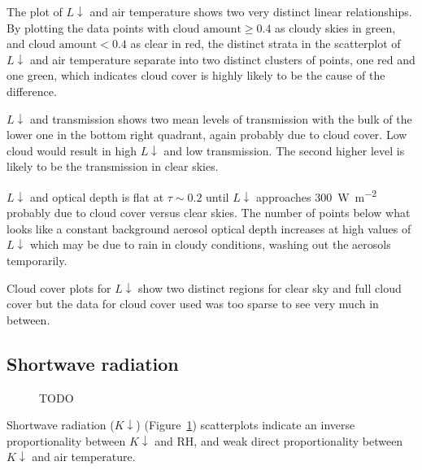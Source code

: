 \documentclass[a4paper,titlepage, twoside]{report}
\newcommand\Kdown{K\!\!\downarrow}
\newcommand\Ldown{L\!\!\downarrow}
\begin{document}
The plot of $\Ldown$ and air temperature shows two very distinct linear relationships. By plotting the data points with $\text{cloud amount} \geq 0.4$ as cloudy skies in green, and $\text{cloud amount} < 0.4$ as clear in red, the distinct strata in the scatterplot of $\Ldown$ and air temperature separate into two distinct clusters of points, one red and one green, which indicates cloud cover is highly likely to be the cause of the difference.

$\Ldown$ and transmission shows two mean levels of transmission with the bulk of the lower one in the bottom right quadrant, again probably due to cloud cover. Low cloud would result in high $\Ldown$ and low transmission. The second higher level is likely to be the transmission in clear skies.

$\Ldown$ and optical depth is flat at $\tau \sim 0.2$ until $\Ldown$ approaches \SI{300}{\watt\per\meter\squared} probably due to cloud cover versus clear skies. The number of points below what looks like a constant background aerosol optical depth increases at high values of $\Ldown$ which may be due to rain in cloudy conditions, washing out the aerosols temporarily.

Cloud cover plots for $\Ldown$ show two distinct regions for clear sky and full cloud cover but the data for cloud cover used was too sparse to see very much in between.

\subsection{Shortwave radiation}
\begin{figure}
\centering
\caption{TODO}
\label{fig:data-3}
\end{figure}

Shortwave radiation ($\Kdown$) (Figure~\ref{fig:data-3}) scatterplots indicate an inverse proportionality between $\Kdown$ and $\mathrm{RH}$, and weak direct proportionality between $\Kdown$ and air temperature. 
\end{document}

